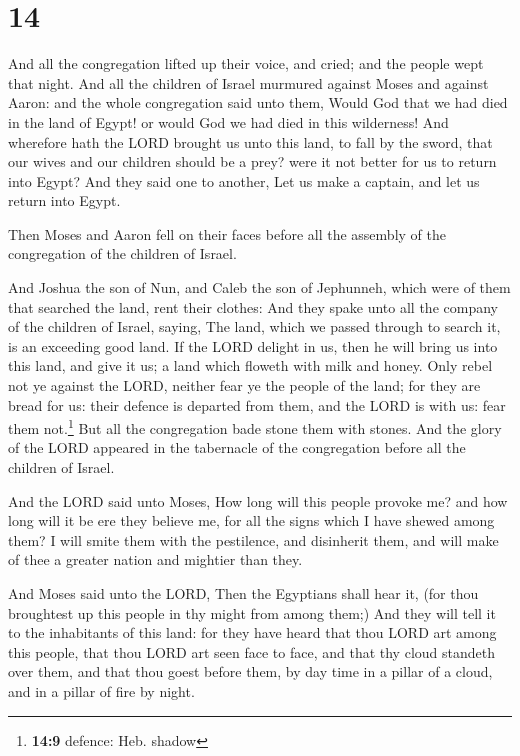 \hypertarget{section-13}{%
\section{14}\label{section-13}}

 And all the congregation lifted up their voice, and
cried; and the people wept that night.  And all the
children of Israel murmured against Moses and against Aaron: and the
whole congregation said unto them, Would God that we had died in the
land of Egypt! or would God we had died in this wilderness!
 And wherefore hath the LORD brought us unto this land, to
fall by the sword, that our wives and our children should be a prey?
were it not better for us to return into Egypt?  And they
said one to another, Let us make a captain, and let us return into
Egypt.

 Then Moses and Aaron fell on their faces before all the
assembly of the congregation of the children of Israel.

 And Joshua the son of Nun, and Caleb the son of
Jephunneh, which were of them that searched the land, rent their
clothes:  And they spake unto all the company of the
children of Israel, saying, The land, which we passed through to search
it, is an exceeding good land.  If the LORD delight in us,
then he will bring us into this land, and give it us; a land which
floweth with milk and honey.  Only rebel not ye against
the LORD, neither fear ye the people of the land; for they are bread for
us: their defence is departed from them, and the LORD is with us: fear
them not.\footnote{\textbf{14:9} defence: Heb. shadow} 
But all the congregation bade stone them with stones. And the glory of
the LORD appeared in the tabernacle of the congregation before all the
children of Israel.

 And the LORD said unto Moses, How long will this people
provoke me? and how long will it be ere they believe me, for all the
signs which I have shewed among them?  I will smite them
with the pestilence, and disinherit them, and will make of thee a
greater nation and mightier than they.

 And Moses said unto the LORD, Then the Egyptians shall
hear it, (for thou broughtest up this people in thy might from among
them;)  And they will tell it to the inhabitants of this
land: for they have heard that thou LORD art among this people, that
thou LORD art seen face to face, and that thy cloud standeth over them,
and that thou goest before them, by day time in a pillar of a cloud, and
in a pillar of fire by night.

